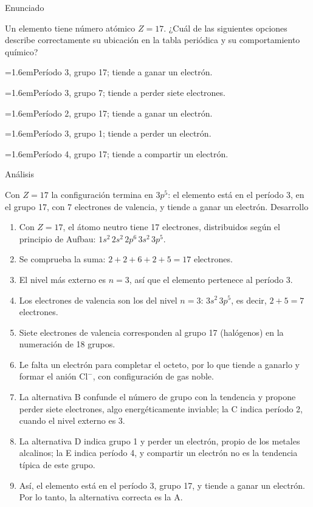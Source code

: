 \documentclass[10pt,a4paper,twocolumn]{article}
\newcommand{\alternativa}[2]{\par\noindent\hangindent=1.6em\hangafter=1\makebox[1.6em][l]{\tecla{#1}}#2\par}
\newcommand{\clave}[1]{\par\smallskip{\sffamily\footnotesize\color{esmeralda} Clave \teclaok{#1}}\par}
\begin{document}
\begin{ejemplo}
{\sffamily\footnotesize\color{zinc500} Enunciado}\par
Un elemento tiene número atómico $Z = 17$. ¿Cuál de las siguientes opciones describe correctamente su ubicación en la tabla periódica y su comportamiento químico?
\alternativa{A}{Período 3, grupo 17; tiende a ganar un electrón.}
\alternativa{B}{Período 3, grupo 7; tiende a perder siete electrones.}
\alternativa{C}{Período 2, grupo 17; tiende a ganar un electrón.}
\alternativa{D}{Período 3, grupo 1; tiende a perder un electrón.}
\alternativa{E}{Período 4, grupo 17; tiende a compartir un electrón.}
\clave{A}
{\sffamily\footnotesize\color{zinc500} Análisis}\par Con $Z = 17$ la configuración termina en $3p^5$: el elemento está en el período 3, en el grupo 17, con 7 electrones de valencia, y tiende a ganar un electrón.
{\sffamily\footnotesize\color{zinc500} Desarrollo}
\begin{enumerate}
  \item Con $Z = 17$, el átomo neutro tiene 17 electrones, distribuidos según el principio de Aufbau: $1s^2\,2s^2\,2p^6\,3s^2\,3p^5$.
  \item Se comprueba la suma: $2 + 2 + 6 + 2 + 5 = 17$ electrones.
  \item El nivel más externo es $n = 3$, así que el elemento pertenece al período 3.
  \item Los electrones de valencia son los del nivel $n = 3$: $3s^2\,3p^5$, es decir, $2 + 5 = 7$ electrones.
  \item Siete electrones de valencia corresponden al grupo 17 (halógenos) en la numeración de 18 grupos.
  \item Le falta un electrón para completar el octeto, por lo que tiende a ganarlo y formar el anión $\mathrm{Cl^-}$, con configuración de gas noble.
  \item La alternativa B confunde el número de grupo con la tendencia y propone perder siete electrones, algo energéticamente inviable; la C indica período 2, cuando el nivel externo es 3.
  \item La alternativa D indica grupo 1 y perder un electrón, propio de los metales alcalinos; la E indica período 4, y compartir un electrón no es la tendencia típica de este grupo.
  \item Así, el elemento está en el período 3, grupo 17, y tiende a ganar un electrón. Por lo tanto, la alternativa correcta es la A.
\end{enumerate}
\end{ejemplo}
\end{document}
